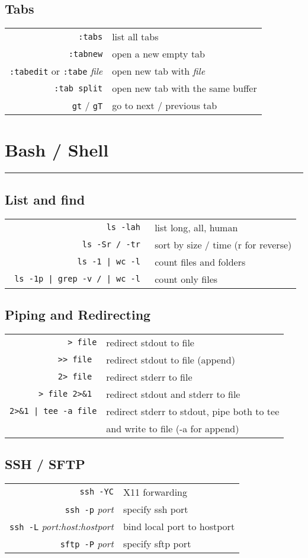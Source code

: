 \begin{multicols*}{3}
\subsection*{Tabs}
\begin{tabular}{@{}rl@{}}
  \verb|:tabs| & list all tabs \\
  \verb|:tabnew| & open a new empty tab \\
  \verb|:tabedit| or \verb|:tabe| \itshape{file} & open new tab with \itshape{file} \\
  \verb|:tab split| & open new tab with the same buffer \\
  \verb|gt| / \verb|gT| & go to next / previous tab
\end{tabular}

\section*{Bash / Shell}
\hrule\vspace*{2pt}
\subsection*{List and find}
\begin{tabular}{@{}rl@{}}
\verb| ls -lah | & list long, all, human \\
\verb| ls -Sr / -tr | & sort by size / time (r for reverse) \\
\verb= ls -1 | wc -l = & count files and folders \\
\verb= ls -1p | grep -v / | wc -l = & count only files
\end{tabular}
\subsection*{Piping and Redirecting}
\begin{tabular}{@{}rl@{}}
\verb|> file| & redirect stdout to file \\
\verb|>> file | & redirect stdout to file (append) \\
\verb|2> file | & redirect stderr to file \\
\verb|> file 2>&1 | & redirect stdout and stderr to file \\
\verb=2>&1 | tee -a file= & redirect stderr to stdout, pipe both to tee \\ & and write to file (-a for append) \\
\end{tabular}
\subsection*{SSH / SFTP}
\begin{tabular}{@{}rl@{}}
  \verb|ssh -YC| & X11 forwarding \\
  \verb|ssh -p| \itshape{port} & specify ssh port \\
  \verb|ssh -L| \itshape{port:host:hostport} & bind local port to hostport \\
  \verb|sftp -P| \itshape{port} & specify sftp port
\end{tabular}

\end{multicols*}
